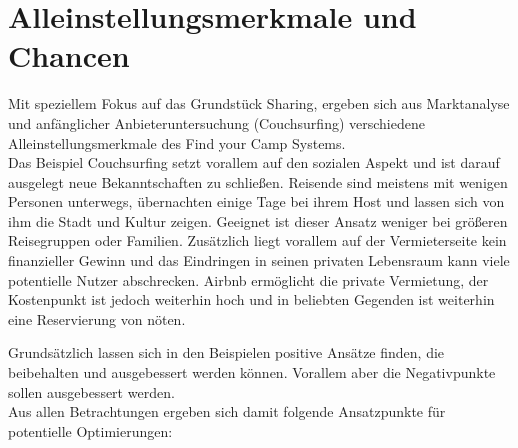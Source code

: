 

\section{Alleinstellungsmerkmale und Chancen}
Mit speziellem Fokus auf das Grundstück Sharing, ergeben sich aus Marktanalyse und anfänglicher Anbieteruntersuchung (Couchsurfing) verschiedene Alleinstellungsmerkmale des Find your Camp Systems.\\

Das Beispiel Couchsurfing setzt vorallem auf den sozialen Aspekt und ist darauf ausgelegt neue Bekanntschaften zu schließen. Reisende sind meistens mit wenigen Personen unterwegs, übernachten einige Tage bei ihrem Host und lassen sich von ihm die Stadt und Kultur zeigen.
Geeignet ist dieser Ansatz weniger bei größeren Reisegruppen oder Familien. Zusätzlich liegt vorallem auf der Vermieterseite kein finanzieller Gewinn und das Eindringen in seinen privaten Lebensraum kann viele potentielle Nutzer abschrecken.
Airbnb ermöglicht die private Vermietung, der Kostenpunkt ist jedoch weiterhin hoch und in beliebten Gegenden ist weiterhin eine Reservierung von nöten. 

Grundsätzlich lassen sich in den Beispielen positive Ansätze finden, die beibehalten und ausgebessert werden können. Vorallem aber die Negativpunkte sollen ausgebessert werden.\\ Aus allen Betrachtungen ergeben sich damit folgende Ansatzpunkte für potentielle Optimierungen:

